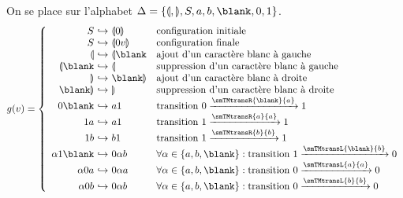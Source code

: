 \begin{exercice}
\begin{questions}
\begin{center}
    \end{center}
  \end{questions}
  \begin{corrections}
    On se place sur l'alphabet $\Delta = \{\llparenthesis, \rrparenthesis, S, a, b, \blank, 0, 1\}$. 
    $$
    g(v) = 
    \left\{\begin{array}{r@{~\hookrightarrow~}ll}
    S               & \llparenthesis0\rrparenthesis  & \text{configuration initiale}\\
    S               & \llparenthesis0v\rrparenthesis & \text{configuration finale}\\
    \llparenthesis         & \llparenthesis\blank    & \text{ajout d'un caractère blanc à gauche}\\
    \llparenthesis\blank   & \llparenthesis          & \text{suppression d'un caractère blanc à gauche}\\
    \rrparenthesis         & \blank \rrparenthesis   & \text{ajout d'un caractère blanc à droite}\\
    \blank \rrparenthesis  & \rrparenthesis          & \text{suppression d'un caractère blanc à droite}\\
    0\blank         & a1               & \text{transition $0\xrightarrow{\smTMtransR{\blank}{a}} 1$}\\
    1a              & a1               & \text{transition $1\xrightarrow{\smTMtransR{a}{a}} 1$}\\
    1b              & b1               & \text{transition $1\xrightarrow{\smTMtransR{b}{b}} 1$}\\
    \alpha 1 \blank & 0 \alpha b & \forall \alpha \in \{a, b, \blank\} : \text{transition $1\xrightarrow{\smTMtransL{\blank}{b}} 0$}\\ 
    \alpha 0 a      & 0 \alpha a & \forall \alpha \in \{a, b, \blank\} : \text{transition $0\xrightarrow{\smTMtransL{a}{a}} 0$}\\ 
    \alpha 0 b      & 0 \alpha b & \forall \alpha \in \{a, b, \blank\} : \text{transition $0\xrightarrow{\smTMtransL{b}{b}} 0$}
    \end{array}\right.
    $$
  \end{corrections}
  

\end{exercice}
